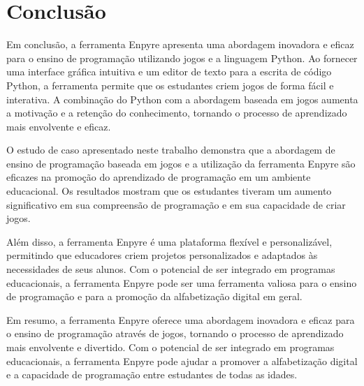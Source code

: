 \chapter[Conclusão]{Conclusão}

Em conclusão, a ferramenta Enpyre apresenta uma abordagem inovadora e eficaz para o ensino de programação utilizando jogos e a linguagem Python. Ao fornecer uma interface gráfica intuitiva e um editor de texto para a escrita de código Python, a ferramenta permite que os estudantes criem jogos de forma fácil e interativa. A combinação do Python com a abordagem baseada em jogos aumenta a motivação e a retenção do conhecimento, tornando o processo de aprendizado mais envolvente e eficaz.

O estudo de caso apresentado neste trabalho demonstra que a abordagem de ensino de programação baseada em jogos e a utilização da ferramenta Enpyre são eficazes na promoção do aprendizado de programação em um ambiente educacional. Os resultados mostram que os estudantes tiveram um aumento significativo em sua compreensão de programação e em sua capacidade de criar jogos.

Além disso, a ferramenta Enpyre é uma plataforma flexível e personalizável, permitindo que educadores criem projetos personalizados e adaptados às necessidades de seus alunos. Com o potencial de ser integrado em programas educacionais, a ferramenta Enpyre pode ser uma ferramenta valiosa para o ensino de programação e para a promoção da alfabetização digital em geral.

Em resumo, a ferramenta Enpyre oferece uma abordagem inovadora e eficaz para o ensino de programação através de jogos, tornando o processo de aprendizado mais envolvente e divertido. Com o potencial de ser integrado em programas educacionais, a ferramenta Enpyre pode ajudar a promover a alfabetização digital e a capacidade de programação entre estudantes de todas as idades.